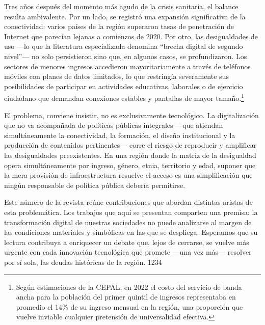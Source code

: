 \documentclass{article}
\begin{document}
Tres años después del momento más agudo de la crisis sanitaria, el balance resulta ambivalente. Por un lado, se registró una expansión significativa de la conectividad: varios países de la región superaron tasas de penetración de Internet que parecían lejanas a comienzos de 2020. Por otro, las desigualdades de uso —lo que la literatura especializada denomina “brecha digital de segundo nivel”— no solo persistieron sino que, en algunos casos, se profundizaron. Los sectores de menores ingresos accedieron mayoritariamente a través de teléfonos móviles con planes de datos limitados, lo que restringía severamente sus posibilidades de participar en actividades educativas, laborales o de ejercicio ciudadano que demandan conexiones estables y pantallas de mayor tamaño.\footnote{Según estimaciones de la CEPAL, en 2022 el costo del servicio de
banda ancha para la población del primer quintil de ingresos
representaba en promedio el 14\% de su ingreso mensual en la región, una
proporción que vuelve inviable cualquier pretensión de universalidad
efectiva.}

El problema, conviene insistir, no es exclusivamente tecnológico. La digitalización que no va acompañada de políticas públicas integrales —que atiendan simultáneamente la conectividad, la formación, el diseño institucional y la producción de contenidos pertinentes— corre el riesgo de reproducir y amplificar las desigualdades preexistentes. En una región donde la matriz de la desigualdad opera simultáneamente por ingreso, género, etnia, territorio y edad, suponer que la mera provisión de infraestructura resuelve el acceso es una simplificación que ningún responsable de política pública debería permitirse.

Este número de la revista reúne contribuciones que abordan distintas aristas de esta problemática. Los trabajos que aquí se presentan comparten una premisa: la transformación digital de nuestras sociedades no puede analizarse al margen de las condiciones materiales y simbólicas en las que se despliega. Esperamos que su lectura contribuya a enriquecer un debate que, lejos de cerrarse, se vuelve más urgente con cada innovación tecnológica que promete —una vez más— resolver por sí sola, las deudas históricas de la región. 1234
\end{document}
